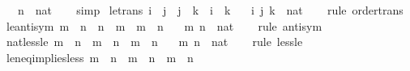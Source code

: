\begin{isabellebody}
\ \ \ n\ {\isacharcolon}{\kern0pt}{\isacharcolon}{\kern0pt}\ nat\isanewline
%
\isadelimproof
\ \ %
\endisadelimproof
%
\isatagproof
{}\isamarkupfalse%
\ simp%
\endisatagproof
{\isafoldproof}%
%
\isadelimproof
\isanewline
%
\endisadelimproof
\isanewline
{}\isamarkupfalse%
\ le{\isacharunderscore}{\kern0pt}trans{\isacharcolon}{\kern0pt}\ {\isachardoublequoteopen}i\ {\isasymle}\ j\ {\isasymLongrightarrow}\ j\ {\isasymle}\ k\ {\isasymLongrightarrow}\ i\ {\isasymle}\ k{\isachardoublequoteclose}\isanewline
\ \ \ i\ j\ k\ {\isacharcolon}{\kern0pt}{\isacharcolon}{\kern0pt}\ nat\isanewline
%
\isadelimproof
\ \ %
\endisadelimproof
%
\isatagproof
{}\isamarkupfalse%
\ {\isacharparenleft}{\kern0pt}rule\ order{\isacharunderscore}{\kern0pt}trans{\isacharparenright}{\kern0pt}%
\endisatagproof
{\isafoldproof}%
%
\isadelimproof
\isanewline
%
\endisadelimproof
\isanewline
{}\isamarkupfalse%
\ le{\isacharunderscore}{\kern0pt}antisym{\isacharcolon}{\kern0pt}\ {\isachardoublequoteopen}m\ {\isasymle}\ n\ {\isasymLongrightarrow}\ n\ {\isasymle}\ m\ {\isasymLongrightarrow}\ m\ {\isacharequal}{\kern0pt}\ n{\isachardoublequoteclose}\isanewline
\ \ \ m\ n\ {\isacharcolon}{\kern0pt}{\isacharcolon}{\kern0pt}\ nat\isanewline
%
\isadelimproof
\ \ %
\endisadelimproof
%
\isatagproof
{}\isamarkupfalse%
\ {\isacharparenleft}{\kern0pt}rule\ antisym{\isacharparenright}{\kern0pt}%
\endisatagproof
{\isafoldproof}%
%
\isadelimproof
\isanewline
%
\endisadelimproof
\isanewline
{}\isamarkupfalse%
\ nat{\isacharunderscore}{\kern0pt}less{\isacharunderscore}{\kern0pt}le{\isacharcolon}{\kern0pt}\ {\isachardoublequoteopen}m\ {\isacharless}{\kern0pt}\ n\ {\isasymlongleftrightarrow}\ m\ {\isasymle}\ n\ {\isasymand}\ m\ {\isasymnoteq}\ n{\isachardoublequoteclose}\isanewline
\ \ \ m\ n\ {\isacharcolon}{\kern0pt}{\isacharcolon}{\kern0pt}\ nat\isanewline
%
\isadelimproof
\ \ %
\endisadelimproof
%
\isatagproof
{}\isamarkupfalse%
\ {\isacharparenleft}{\kern0pt}rule\ less{\isacharunderscore}{\kern0pt}le{\isacharparenright}{\kern0pt}%
\endisatagproof
{\isafoldproof}%
%
\isadelimproof
\isanewline
%
\endisadelimproof
\isanewline
{}\isamarkupfalse%
\ le{\isacharunderscore}{\kern0pt}neq{\isacharunderscore}{\kern0pt}implies{\isacharunderscore}{\kern0pt}less{\isacharcolon}{\kern0pt}\ {\isachardoublequoteopen}m\ {\isasymle}\ n\ {\isasymLongrightarrow}\ m\ {\isasymnoteq}\ n\ {\isasymLongrightarrow}\ m\ {\isacharless}{\kern0pt}\ n{\isachardoublequoteclose}\isanewline

\end{isabellebody}
